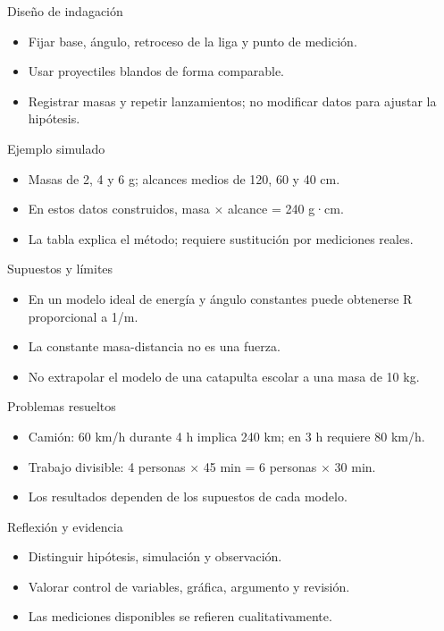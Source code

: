 \documentclass[
	spanish,
	aspectratio=1610,
	xcolor={dvipsnames,table}
]{beamer}
\begin{document}
\begin{frame}{Diseño de indagación}
\fontsize{14}{18}\selectfont\begin{itemize}\setlength{\itemsep}{.45cm}
\item Fijar base, ángulo, retroceso de la liga y punto de medición.
\item Usar proyectiles blandos de forma comparable.
\item Registrar masas y repetir lanzamientos; no modificar datos para ajustar la hipótesis.
\end{itemize}
\end{frame}
\begin{frame}{Ejemplo simulado}
\fontsize{14}{18}\selectfont\begin{itemize}\setlength{\itemsep}{.45cm}
\item Masas de 2, 4 y 6 g; alcances medios de 120, 60 y 40 cm.
\item En estos datos construidos, masa $\times$ alcance = 240 g·cm.
\item La tabla explica el método; requiere sustitución por mediciones reales.
\end{itemize}
\end{frame}
\begin{frame}{Supuestos y límites}
\fontsize{14}{18}\selectfont\begin{itemize}\setlength{\itemsep}{.45cm}
\item En un modelo ideal de energía y ángulo constantes puede obtenerse R proporcional a 1/m.
\item La constante masa-distancia no es una fuerza.
\item No extrapolar el modelo de una catapulta escolar a una masa de 10 kg.
\end{itemize}
\end{frame}
\begin{frame}{Problemas resueltos}
\fontsize{14}{18}\selectfont\begin{itemize}\setlength{\itemsep}{.45cm}
\item Camión: 60 km/h durante 4 h implica 240 km; en 3 h requiere 80 km/h.
\item Trabajo divisible: 4 personas $\times$ 45 min = 6 personas $\times$ 30 min.
\item Los resultados dependen de los supuestos de cada modelo.
\end{itemize}
\end{frame}
\begin{frame}{Reflexión y evidencia}
\fontsize{14}{18}\selectfont\begin{itemize}\setlength{\itemsep}{.45cm}
\item Distinguir hipótesis, simulación y observación.
\item Valorar control de variables, gráfica, argumento y revisión.
\item Las mediciones disponibles se refieren cualitativamente.
\end{itemize}
\end{frame}
\end{document}
